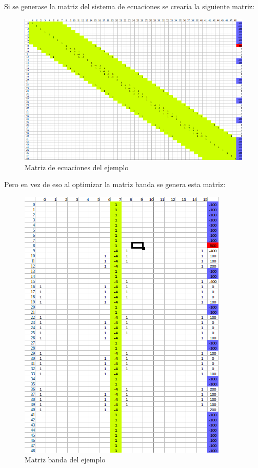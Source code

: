 Si se generase la matriz del sistema de ecuaciones se crearía la siguiente matriz:

\newpage
\begin{figure}[htb]
\begin{center}
\includegraphics[scale=0.50]{imagenes/matrizej.png} 
\caption{Matriz de ecuaciones del ejemplo} 
\end{center}
\end{figure}

\newpage

Pero en vez de eso al optimizar la matriz banda se genera esta matriz:

\begin{figure}[htb]
\begin{center}
\includegraphics[scale=0.70]{imagenes/matrizbandaej.png} 
\caption{Matriz banda del ejemplo} 
\end{center}
\end{figure}

